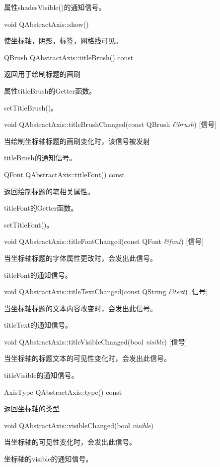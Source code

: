 \begin{notice}
属性shadesVisible()的通知信号。
\end{notice}


void QAbstractAxis::show() 

使坐标轴，阴影，标签，网格线可见。

QBrush QAbstractAxis::titleBrush() const 

返回用于绘制标题的画刷

\begin{notice}
属性titleBrush的Getter函数。
\end{notice}

\begin{seeAlso}
setTitleBrush()。
\end{seeAlso}

void QAbstractAxis::titleBrushChanged(const QBrush \emph{\&brush}) [信号] 

当绘制坐标轴标题的画刷变化时，该信号被发射 

\begin{notice}
titleBrush的通知信号。
\end{notice}

QFont QAbstractAxis::titleFont() const 

返回绘制标题的笔相关属性。 

\begin{notice}
titleFont的Getter函数。
\end{notice}

\begin{seeAlso}
setTitleFont()。
\end{seeAlso}

void QAbstractAxis::titleFontChanged(const QFont \emph{\&font}) [信号]

当坐标轴标题的字体属性更改时，会发出此信号。 

\begin{notice}
titleFont的通知信号。
\end{notice}

void QAbstractAxis::titleTextChanged(const QString \emph{\&text}) [信号] 

当坐标轴标题的文本内容改变时，会发出此信号。 

\begin{notice}
titleText的通知信号。
\end{notice}

void QAbstractAxis::titleVisibleChanged(bool \emph{visible}) [信号] 

当坐标轴的标题文本的可见性变化时，会发出此信号。 

\begin{notice}
titleVisible的通知信号。
\end{notice}

AxisType QAbstractAxis::type() const 

返回坐标轴的类型

void QAbstractAxis::visibleChanged(bool \emph{visible}) 

当坐标轴的可见性变化时，会发出此信号。 

\begin{notice}
坐标轴的visible的通知信号。
\end{notice}